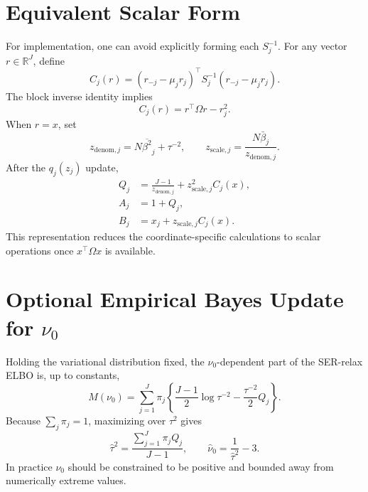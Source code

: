 \documentclass[11pt]{article}
\newcommand{\Om}{\Omega}
\begin{document}
\section{Equivalent Scalar Form}

For implementation, one can avoid explicitly forming each \(S_j^{-1}\).
For any vector \(r\in\mathbb R^J\), define
\[
C_j(r)
=
(r_{-j}-\mu_jr_j)^\top S_j^{-1}(r_{-j}-\mu_jr_j).
\]
The block inverse identity implies
\[
C_j(r)=r^\top\Om r-r_j^2.
\]
When \(r=x\), set
\[
z_{\mathrm{denom},j}
=
N\overline{\beta^2}_j+\tau^{-2},
\qquad
z_{\mathrm{scale},j}
=
\frac{N\bar\beta_j}{z_{\mathrm{denom},j}}.
\]
After the \(q_j(z_j)\) update,
\begin{align}
Q_j
&=
\frac{J-1}{z_{\mathrm{denom},j}}
+z_{\mathrm{scale},j}^2C_j(x),\\
A_j&=1+Q_j,\\
B_j&=x_j+z_{\mathrm{scale},j}C_j(x).
\end{align}
This representation reduces the coordinate-specific calculations to
scalar operations once \(x^\top\Om x\) is available.

\section{Optional Empirical Bayes Update for \texorpdfstring{\(\nu_0\)}{nu0}}

Holding the variational distribution fixed, the \(\nu_0\)-dependent part
of the SER-relax ELBO is, up to constants,
\[
M(\nu_0)
=
\sum_{j=1}^J\pi_j
\left\{
\frac{J-1}{2}\log\tau^{-2}
-\frac{\tau^{-2}}{2}Q_j
\right\}.
\]
Because \(\sum_j\pi_j=1\), maximizing over \(\tau^2\) gives
\[
\hat\tau^2
=
\frac{\sum_{j=1}^J\pi_jQ_j}{J-1},
\qquad
\hat\nu_0=\frac{1}{\hat\tau^2}-3.
\]
In practice \(\nu_0\) should be constrained to be positive and bounded
away from numerically extreme values.
\end{document}
